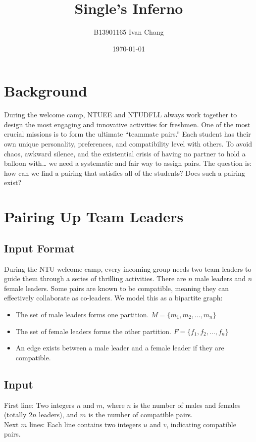 \documentclass[a4paper,12pt]{article}
\title{Single's Inferno}
\author{B13901165 Ivan Chang}
\date{\today}
\begin{document}
\maketitle

\section{Background}
During the welcome camp, NTUEE and NTUDFLL always work together to design the most engaging and innovative activities for freshmen. 
One of the most crucial missions is to form the ultimate “teammate pairs.” Each student has their own unique personality, preferences, and compatibility level with others. 
To avoid chaos, awkward silence, and the existential crisis of having no partner to hold a balloon with… we need a systematic and fair way to assign pairs.
The question is: how can we find a pairing that satisfies all of the students? Does such a pairing exist?

\section{Pairing Up Team Leaders} %
\subsection{Input Format}
During the NTU welcome camp, every incoming group needs two team leaders to guide them through a series of thrilling activities. 
There are $n$ male leaders and $n$ female leaders. Some pairs are known to be compatible, 
meaning they can effectively collaborate as co-leaders.
We model this as a bipartite graph:
\begin{itemize}
    \item The set of male leaders forms one partition. $M = \{m_1, m_2, \dots, m_n\}$ %
    \item The set of female leaders forms the other partition. $F = \{f_1, f_2, \dots, f_n\}$ %
    \item An edge exists between a male leader and a female leader if they are compatible.
\end{itemize}

\subsection{Input}
First line: Two integers $n$ and $m$, where $n$ is the number of males and females (totally $2n$ leaders), and $m$ is the number of compatible pairs.\\
Next $m$ lines: Each line contains two integers $u$ and $v$, indicating compatible pairs.
\end{document}
